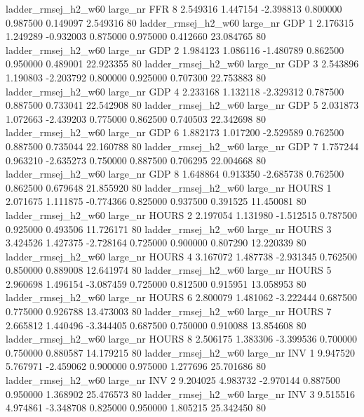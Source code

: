 ladder_rmsej_h2_w60   large_nr      FFR                 8  2.549316  1.447154  -2.398813 0.800000 0.987500  0.149097    2.549316 80
ladder_rmsej_h2_w60   large_nr      GDP                 1  2.176315  1.249289  -0.932003 0.875000 0.975000  0.412660   23.084765 80
ladder_rmsej_h2_w60   large_nr      GDP                 2  1.984123  1.086116  -1.480789 0.862500 0.950000  0.489001   22.923355 80
ladder_rmsej_h2_w60   large_nr      GDP                 3  2.543896  1.190803  -2.203792 0.800000 0.925000  0.707300   22.753883 80
ladder_rmsej_h2_w60   large_nr      GDP                 4  2.233168  1.132118  -2.329312 0.787500 0.887500  0.733041   22.542908 80
ladder_rmsej_h2_w60   large_nr      GDP                 5  2.031873  1.072663  -2.439203 0.775000 0.862500  0.740503   22.342698 80
ladder_rmsej_h2_w60   large_nr      GDP                 6  1.882173  1.017200  -2.529589 0.762500 0.887500  0.735044   22.160788 80
ladder_rmsej_h2_w60   large_nr      GDP                 7  1.757244  0.963210  -2.635273 0.750000 0.887500  0.706295   22.004668 80
ladder_rmsej_h2_w60   large_nr      GDP                 8  1.648864  0.913350  -2.685738 0.762500 0.862500  0.679648   21.855920 80
ladder_rmsej_h2_w60   large_nr    HOURS                 1  2.071675  1.111875  -0.774366 0.825000 0.937500  0.391525   11.450081 80
ladder_rmsej_h2_w60   large_nr    HOURS                 2  2.197054  1.131980  -1.512515 0.787500 0.925000  0.493506   11.726171 80
ladder_rmsej_h2_w60   large_nr    HOURS                 3  3.424526  1.427375  -2.728164 0.725000 0.900000  0.807290   12.220339 80
ladder_rmsej_h2_w60   large_nr    HOURS                 4  3.167072  1.487738  -2.931345 0.762500 0.850000  0.889008   12.641974 80
ladder_rmsej_h2_w60   large_nr    HOURS                 5  2.960698  1.496154  -3.087459 0.725000 0.812500  0.915951   13.058953 80
ladder_rmsej_h2_w60   large_nr    HOURS                 6  2.800079  1.481062  -3.222444 0.687500 0.775000  0.926788   13.473003 80
ladder_rmsej_h2_w60   large_nr    HOURS                 7  2.665812  1.440496  -3.344405 0.687500 0.750000  0.910088   13.854608 80
ladder_rmsej_h2_w60   large_nr    HOURS                 8  2.506175  1.383306  -3.399536 0.700000 0.750000  0.880587   14.179215 80
ladder_rmsej_h2_w60   large_nr      INV                 1  9.947520  5.767971  -2.459062 0.900000 0.975000  1.277696   25.701686 80
ladder_rmsej_h2_w60   large_nr      INV                 2  9.204025  4.983732  -2.970144 0.887500 0.950000  1.368902   25.476573 80
ladder_rmsej_h2_w60   large_nr      INV                 3  9.515516  4.974861  -3.348708 0.825000 0.950000  1.805215   25.342450 80
